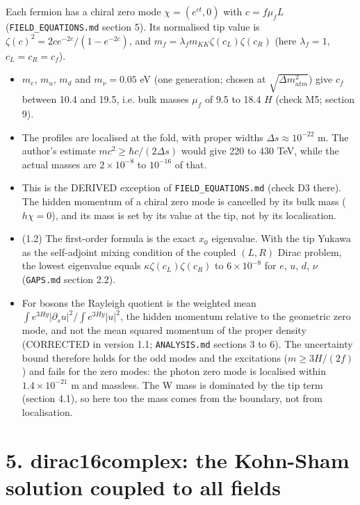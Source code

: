 \documentclass[11pt]{article}
\begin{document}
Each fermion has a chiral zero mode $\chi = (e^{ct}, 0)$ with $c = f\mu_fL$ (\texttt{FIELD\_\allowbreak{}EQUATIONS.\allowbreak{}md} section 5). Its normalised tip value is $\zeta(c)^2 = 2ce^{-2c}/(1 - e^{-2c})$, and $m_f = \lambda_f m_{KK}\zeta(c_L)\zeta(c_R)$ (here $\lambda_f = 1$, $c_L = c_R = c_f$).
\begin{itemize}
\item $m_e$, $m_u$, $m_d$ and $m_\nu = 0.05$ eV (one generation; chosen at $\sqrt{\Delta m^2_{atm}}$) give $c_f$ between 10.4 and 19.5, i.e. bulk masses $\mu_f$ of 9.5 to 18.4 $H$ (check M5; section 9).
\item The profiles are localised at the fold, with proper widths $\Delta s \approx 10^{-22}$ m. The author's estimate $mc^2 \geq \hbar c/(2\Delta s)$ would give 220 to 430 TeV, while the actual masses are $2\times10^{-8}$ to $10^{-16}$ of that.
\item This is the DERIVED exception of \texttt{FIELD\_\allowbreak{}EQUATIONS.\allowbreak{}md} (check D3 there). The hidden momentum of a chiral zero mode is cancelled by its bulk mass ($h\chi = 0$), and its mass is set by its value at the tip, not by its localisation.
\item (1.2) The first-order formula is the exact $x_0$ eigenvalue. With the tip Yukawa as the self-adjoint mixing condition of the coupled $(L, R)$ Dirac problem, the lowest eigenvalue equals $\kappa\zeta(c_L)\zeta(c_R)$ to $6\times10^{-8}$ for $e$, $u$, $d$, $\nu$ (\texttt{GAPS.\allowbreak{}md} section 2.2).
\item For bosons the Rayleigh quotient is the weighted mean $\int e^{3Hy}|\partial_su|^2/\int e^{3Hy}|u|^2$, the hidden momentum relative to the geometric zero mode, and not the mean squared momentum of the proper density (CORRECTED in version 1.1; \texttt{ANALYSIS.\allowbreak{}md} sections 3 to 6). The uncertainty bound therefore holds for the odd modes and the excitations ($m \geq 3H/(2f)$) and fails for the zero modes: the photon zero mode is localised within $1.4\times10^{-21}$ m and massless. The W mass is dominated by the tip term (section 4.1), so here too the mass comes from the boundary, not from localisation.
\end{itemize}

\section*{5. dirac16complex: the Kohn-Sham solution coupled to all fields}
\end{document}
